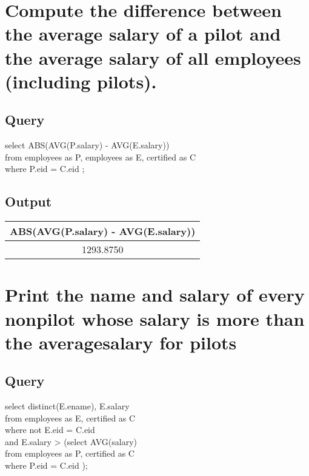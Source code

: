 \documentclass[11pt]{scrartcl} %
\begin{document}




\section{Compute the difference between the average salary of a pilot and the average salary of all employees (including pilots).}

\subsection{Query}
select ABS(AVG(P.salary) - AVG(E.salary))\\
from employees as P, employees as E, certified as C\\
where P.eid = C.eid ;


\subsection{Output}
\begin{left}
\begin{tabular}{ | c | }
\hline
\textbf{ABS(AVG(P.salary) - AVG(E.salary))} \\
\hline
1293.8750 \\
\hline

\end{tabular}
\end{left}




\section{Print the name and salary of every nonpilot whose salary is more than the averagesalary for pilots }

\subsection{Query}
select distinct(E.ename), E.salary\\
from employees as E, certified as C\\
where not E.eid = C.eid \\
\hspace*{10mm}and E.salary > (select AVG(salary) \\
\hspace*{10mm}from employees as P, certified as C \\
\hspace*{10mm}where P.eid = C.eid );
\end{document}
